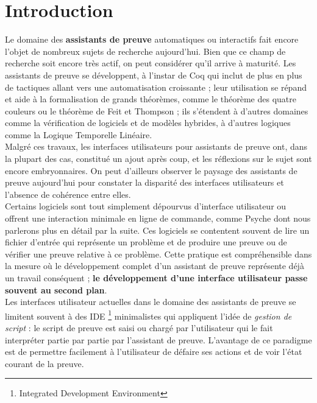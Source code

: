 \section*{Introduction} %

Le domaine des \textbf{assistants de preuve} automatiques ou interactifs fait encore l'objet de nombreux sujets de recherche aujourd'hui. Bien que ce champ de recherche soit encore très actif, on peut considérer qu'il arrive à maturité. Les assistants de preuve se développent, à l'instar de Coq qui inclut de plus en plus de tactiques allant vers une automatisation croissante ; leur utilisation se répand et aide à la formalisation de grands théorèmes, comme le théorème des quatre couleurs ou le théorème de Feit et Thompson ; ils s'étendent à d'autres domaines comme la vérification de logiciels et de modèles hybrides, à d'autres logiques comme la Logique Temporelle Linéaire.\\

Malgré ces travaux, les interfaces utilisateurs pour assistants de preuve ont, dans la plupart des cas, constitué un ajout après coup, et les réflexions sur le sujet sont encore embryonnaires. On peut d'ailleurs observer le paysage des assistants de preuve aujourd'hui pour constater la disparité des interfaces utilisateurs et l'absence de cohérence entre elles.\\

Certains logiciels sont tout simplement dépourvus d'interface utilisateur ou offrent une interaction minimale en ligne de commande, comme Psyche dont nous parlerons plus en détail par la suite. Ces logiciels se contentent souvent de lire un fichier d'entrée qui représente un problème et de produire une preuve ou de vérifier une preuve relative à ce problème. Cette pratique est compréhensible dans la mesure où le développement complet d'un assistant de preuve représente déjà un travail conséquent ; \textbf{le développement d'une interface utilisateur passe souvent au second plan}.\\

Les interfaces utilisateur actuelles dans le domaine des assistants de preuve se limitent souvent à des IDE \footnote{Integrated Development Environment} minimalistes qui appliquent l'idée de \textit{gestion de script} : le script de preuve est saisi ou chargé par l'utilisateur qui le fait interpréter partie par partie par l'assistant de preuve. L'avantage de ce paradigme est de permettre facilement à l'utilisateur de défaire ses actions et de voir l'état courant de la preuve.\\

